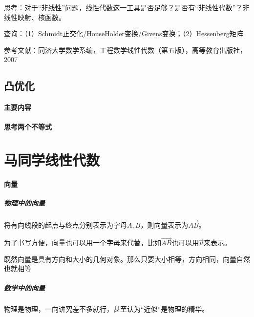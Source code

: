 \documentclass[UTF8]{ctexbook}
\begin{document}
思考：对于“非线性”问题，线性代数这一工具是否足够？是否有“非线性代数”？非线性映射、核函数。

查询：（1）Schmidt正交化/HouseHolder变换/Givens变换；（2）Hessenberg矩阵

参考文献：同济大学数学系编，工程数学线性代数（第五版），高等教育出版社，2007


\newpage

\chapter{凸优化}

\subsection{主要内容}

\subsection{思考两个不等式}






\newpage

\part{马同学线性代数}



\subsection{向量}

\subsubsection{物理中的向量}

将有向线段的起点与终点分别表示为字母$A,B$，则向量表示为$\overrightarrow{AB}$。

为了书写方便，向量也可以用一个字母来代替，比如$\overrightarrow{AB}$也可以用$\vec{u}$来表示。

既然向量是具有方向和大小的几何对象。那么只要大小相等，方向相同，向量自然也就相等

\subsubsection{数学中的向量}

物理是物理，一向讲究差不多就行，甚至认为“近似”是物理的精华。
\end{document}
